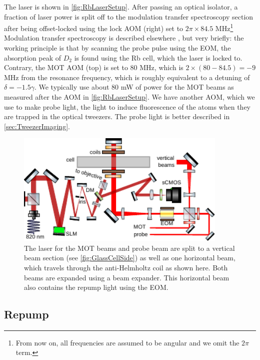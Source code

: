 The laser is shown in \cref{fig:RbLaserSetup}.
After passing an optical isolator, a fraction of laser power is split off to the modulation transfer spectroscopy section after being offset-locked using the lock \ac{AOM} (right) set to $2\pi \times  84.5$ MHz\footnote{From now on, all frequencies are assumed to be angular and we omit the $2\pi$ term.}
Modulation transfer spectroscopy is described elsewhere \cite{McCarron2008,Reijnders2010}, but very briefly: the working principle is that by scanning the probe pulse using the \ac{EOM}, the absorption peak of $D_2$ is found using the Rb cell, which the laser is locked to.  
Contrary, the MOT AOM (top) is set to 80 MHz, which is $2 \times (80 - 84.5) = -9$ MHz from the resonance frequency, which is roughly equivalent to a detuning of $\delta = -1.5 \gamma$.
We typically use about $80$ mW of power for the MOT beams as measured after the \ac{AOM} in \cref{fig:RbLaserSetup}.
We have another AOM, which we use to make probe light, the light to induce fluorescence of the atoms when they are trapped in the optical tweezers.
The probe light is better described in \cref{sec:TweezerImaging}.

\begin{figure}[t]
    \centering
    \includegraphics[width=0.9\textwidth]{figures/MOTupview.pdf}
    \caption{The laser for the MOT beams and probe beam are split to a vertical beam section (see \cref{fig:GlassCellSide}) as well as one horizontal beam, which travels through the anti-Helmholtz coil as shown here. 
    Both beams are expanded using a beam expander.
    This horizontal beam also contains the repump light using the \ac{EOM}.
    }
    \label{fig:GlassCellTop}
\end{figure}

\subsection{Repump}

